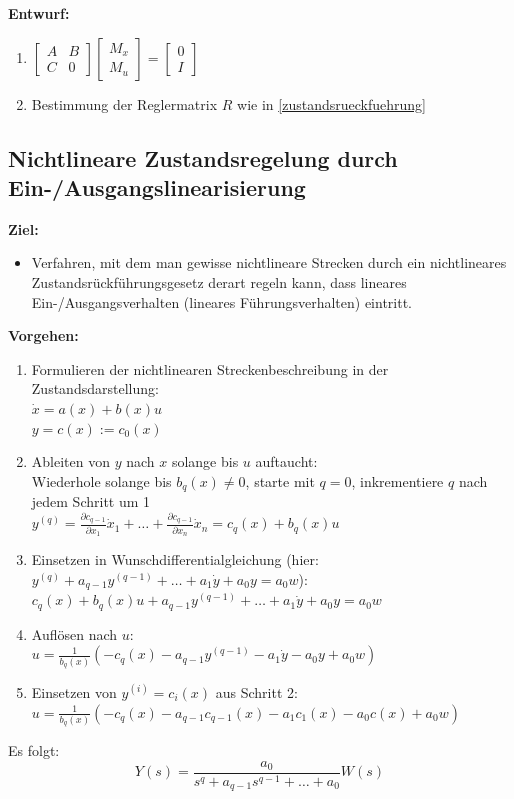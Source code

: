 \documentclass[10pt,a4paper]{article}
\newcommand{\vect}[1]{\ensuremath{\begin{bmatrix}#1\end{bmatrix}}}
\begin{document}
\textbf{Entwurf:}
\begin{enumerate}
	\item $
	\vect{A & B \\ C & 0} \vect{M_x \\ M_u} = \vect{0 \\ I}
	$
	\item Bestimmung der Reglermatrix $R$ wie in \ref{zustandsrueckfuehrung}
\end{enumerate}

\subsection{Nichtlineare Zustandsregelung durch Ein-/Ausgangslinearisierung}
\textbf{Ziel:}
\begin{itemize}
	\item Verfahren, mit dem man gewisse nichtlineare Strecken durch ein nichtlineares Zustandsrückführungsgesetz derart regeln kann, dass lineares Ein-/Ausgangsverhalten (lineares Führungsverhalten) eintritt.
\end{itemize}

\textbf{Vorgehen:}
\begin{enumerate}
	\item Formulieren der nichtlinearen Streckenbeschreibung in der Zustandsdarstellung: \\
	$\dot x = a(x) + b(x) u$ \\
	$y = c(x) := c_0(x)$
	\item Ableiten von $y$ nach $x$ solange bis $u$ auftaucht: \\
	Wiederhole solange bis $b_q(x) ≠ 0$, starte mit $q = 0$, inkrementiere $q$ nach jedem Schritt um 1\\
	$y^{(q)} = \frac{\partial c_{q-1}}{\partial x_1} \dot x_1 + \dots + \frac{\partial c_{q-1}}{\partial x_n} \dot x_n = c_q(x) + b_q(x) u$
	\item Einsetzen in Wunschdifferentialgleichung (hier: $y^{(q)} + a_{q - 1}y^{(q-1)} + \dots + a_1 \dot y + a_0y = a_0 w$): \\
	$c_q(x) + b_q(x) u + a_{q-1} y^{(q-1)} + \dots + a_1 \dot y + a_0 y = a_0 w$
	\item Auflösen nach $u$: \\
	$u = \frac 1 {b_q(x)} (-c_q(x) - a_{q-1} y^{(q-1)} - a_1 \dot y - a_0 y + a_0 w)$
	\item Einsetzen von $y^{(i)} = c_i(x)$ aus Schritt 2: \\
	$u = \frac 1 {b_q(x)} (-c_q(x) - a_{q-1} c_{q-1}(x) - a_1 c_1(x) - a_0 c(x) + a_0 w)$
\end{enumerate}
Es folgt:
$$
	Y(s) = \frac{a_0}{s^q + a_{q-1}s^{q-1} + \dots + a_0} W(s)
$$
\end{document}
